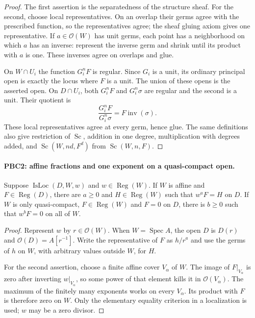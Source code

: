 \begin{proof}
The first assertion is the separatedness of the structure sheaf.
For the second, choose local representatives.  On an overlap their
germs agree with the prescribed function, so the representatives agree;
the sheaf gluing axiom gives one representative.  If $a\in\mathcal O(W)$
has unit germs, each point has a neighborhood on which $a$ has an
inverse: represent the inverse germ and shrink until its product with
$a$ is one.  These inverses agree on overlaps and glue.

On $W\cap U_i$ the function $G_i^nF$ is regular.  Since $G_i$ is a
unit, its ordinary principal open is exactly the locus where $F$ is
a unit.  The union of these opens is the asserted open.  On
$D\cap U_i$, both $G_i^nF$ and $G_i^n\sigma$ are regular and the
second is a unit.  Their quotient is
\[
 \frac{G_i^nF}{G_i^n\sigma}=F\operatorname{inv}(\sigma).
\]
These local representatives agree at every germ, hence glue.
The same definitions also give restriction of $\operatorname{Sc}$,
addition in one degree, multiplication with degrees added, and
$\operatorname{Sc}(W,nd,F^d)$ from
$\operatorname{Sc}(W,n,F)$.
\end{proof}

\paragraph{PBC2: affine fractions and one exponent on a quasi-compact open.}
\label{claim:PBC2}
Suppose $\operatorname{IsLoc}(D,W,w)$ and
$w\in\operatorname{Reg}(W)$.  If $W$ is affine and
$F\in\operatorname{Reg}(D)$, there are $a\ge0$ and
$H\in\operatorname{Reg}(W)$ such that
$w^aF=H$ on $D$.  If $W$ is only quasi-compact,
$F\in\operatorname{Reg}(W)$ and $F=0$ on $D$, there is $b\ge0$
such that $w^bF=0$ on all of $W$.

\begin{proof}
Represent $w$ by $r\in\mathcal O(W)$.  When $W=\operatorname{Spec}A$,
the open $D$ is $D(r)$ and
$\mathcal O(D)=A[r^{-1}]$.  Write the representative of $F$ as
$h/r^a$ and use the germs of $h$ on $W$, with arbitrary values
outside $W$, for $H$.

For the second assertion, choose a finite affine cover $V_\alpha$
of $W$.  The image of $F|_{V_\alpha}$ is zero after inverting
$w|_{V_\alpha}$, so some power of that element kills it in
$\mathcal O(V_\alpha)$.  The maximum of the finitely many exponents
works on every $V_\alpha$.  Its product with $F$ is therefore zero
on $W$.  Only the elementary equality criterion in a localization
is used; $w$ may be a zero divisor.
\end{proof}

